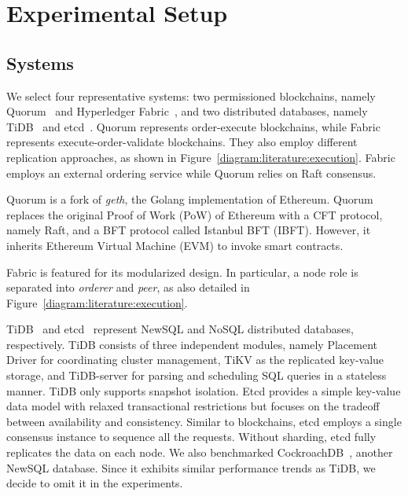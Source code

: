 \section{Experimental Setup}
\label{ch:twin:setup}
\subsection{Systems}

We select four representative systems: two permissioned blockchains, namely Quorum~\cite{web:quorum} and Hyperledger Fabric~\cite{web:fabric}, and two distributed databases, namely TiDB~\cite{web:tidb} and etcd~\cite{web:etcd}.
Quorum represents order-execute blockchains, while Fabric represents execute-order-validate blockchains. 
They also employ different replication approaches, as shown in Figure~\ref{diagram:literature:execution}.
Fabric employs an external ordering service while Quorum relies on Raft consensus.

Quorum is a fork of \textit{geth}, the Golang implementation of Ethereum. 
Quorum replaces the original Proof of Work (PoW) of Ethereum with a CFT protocol, namely Raft, and a BFT protocol called
Istanbul BFT (IBFT). However, it inherits Ethereum Virtual Machine (EVM) to invoke smart contracts.

Fabric is featured for its modularized design. 
In particular, a node role is separated into \textit{orderer} and \textit{peer}, as also detailed in Figure~\ref{diagram:literature:execution}.

TiDB~\cite{web:tidb} and etcd~\cite{web:etcd} represent NewSQL and NoSQL
distributed databases, respectively.
TiDB consists of three independent modules, namely Placement Driver for
coordinating cluster management, TiKV as the replicated key-value storage, and
TiDB-server for parsing and scheduling SQL queries in a stateless manner. TiDB
only supports snapshot isolation.
Etcd provides a simple key-value data model with relaxed transactional
restrictions but focuses on the tradeoff between availability and consistency.
Similar to blockchains, etcd employs a single consensus instance to sequence all
the requests.
Without sharding, etcd fully replicates the data on each node.
We also benchmarked CockroachDB~\cite{web:cockroach}, another NewSQL database. Since it exhibits similar performance trends as TiDB, we decide to omit it in the experiments. 

